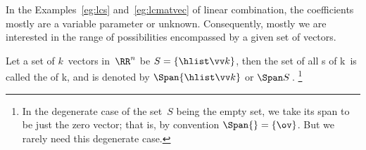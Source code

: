 In the Examples~\ref{eg:lcs} and~\ref{eg:lcmatvec} of linear combination, the coefficients mostly are a variable parameter or unknown.
Consequently, mostly we are interested in the range of possibilities encompassed by a given set of vectors.


\begin{definition} \label{def:span} 
Let a set of \(k\)~vectors in~\(\RR^n\) be  \(S=\{\hlist\vv k\}\), then the set of all s of \hlist\vv k\ is called the  of \hlist\vv k, and is denoted by \(\Span\{\hlist\vv k\}\) or \(\Span S\)\,.%
\footnote{In the degenerate case of the set~\(S\) being the empty set, we take its span to be just the zero vector; that is, by convention \(\Span\{\}=\{\ov\}\).  But we rarely need this degenerate case.}
\end{definition}



